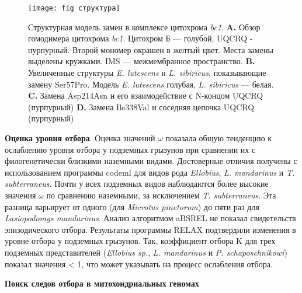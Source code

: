 
\begin{figure}[h!]
	\begin{center}
		\texttt{[image: fig структура]}
	\end{center}
	\caption{Структурная модель замен в комплексе цитохрома \textit{bc1}. \textbf{A.} Обзор гомодимера цитохрома \textit{bc1}. Цитохром Б --- голубой, UQCRQ - пурпурный. Второй мономер окрашен в желтый цвет. Места замены выделены кружками. IMS --- межмембранное пространство. \textbf{B.} Увеличенные структуры \textit{E. lutescens} и \textit{L. sibiricus}, показывающие замену Ser57Pro. Модель \textit{E. lutescens} голубая, \textit{L. sibiricus} --- белая. \textbf{C.} Замена Asp214Asn и его взаимодействие с N-концом UQCRQ (пурпурный) \textbf{D.} Замена Ile338Val и соседняя цепочка UQCRQ (пурпурный)}
	\label{CytStructure}
\end{figure}

\textbf{Оценка уровня отбора}. Оценка значений $\omega$ показала общую тенденцию к ослаблению уровня отбора у подземных грызунов при сравнении их с филогенетически близкими наземными видами. Достоверные отличия получены с использованием программы codeml для видов рода \textit{Ellobius}, \textit{L. mandarinus} и \textit{T. subterraneus}. Почти у всех подземных видов наблюдаются более высокие значения $\omega$ по сравнению наземными, за исключением \textit{T. subterraneus}. Эта разница варьирует от одного (для \textit{Microtus pinetorum}) до пяти раз для \textit{Lasiopodomys mandarinus}. Анализ алгоритмом aBSREL не показал свидетельств эпизодического отбора. Результаты программы RELAX подтвердили изменения в уровне отбора у подземных грызунов. Так, коэффициент отбора K для трех подземных представителей (\textit{Ellobius sp.}, \textit{L. mandarinus} и \textit{P. schaposchnikowi}) показал значения < 1, что может указывать на процесс ослабления отбора. 

\vspace{3mm}

\hspace{-10mm}\textbf{\Large Поиск следов отбора в митохондриальных геномах}

\vspace{3mm}

